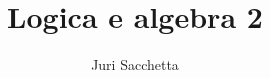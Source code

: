 \documentclass[a4paper]{book}
\begin{document}
	\author{Juri Sacchetta}
	\title{Logica e algebra 2}
	\maketitle
	\tableofcontents
	
\end{document}
